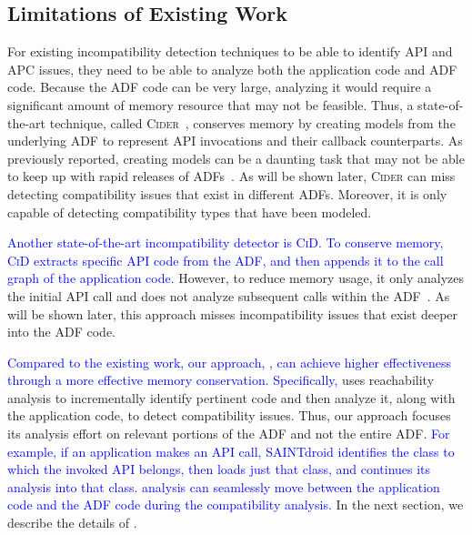 \subsection{Limitations of Existing Work}


For existing incompatibility detection techniques to be able
to identify API and APC issues, they need to be able to
analyze both the application code and ADF code. Because the
ADF code can be very large, analyzing it would require a
significant amount of memory resource that may not be
feasible. Thus, a state-of-the-art technique, called
\textsc{Cider}~\cite{huang2018understanding}, conserves memory by creating models from the underlying ADF to represent API invocations and their
callback counterparts.  
As previously reported, creating models can be a daunting task
that may not be able to keep up with rapid releases of
ADFs~\cite{vanderMerwe2012}.  As will be shown later,
\textsc{Cider} can miss detecting compatibility issues that
exist in different ADFs.  Moreover, it is only capable of
detecting compatibility types that have been modeled.

\textcolor{blue}{
Another state-of-the-art  incompatibility detector is \textsc{CiD}\cite{lili2018cid}. To  conserve memory, \textsc{CiD} extracts
specific API code from the ADF, and then appends it to the
call graph of the application code. } However, to reduce
memory usage, it only analyzes the initial API call and does
not analyze subsequent calls within the
ADF~\cite{lili2018cid}. 
As will be
shown later, this approach misses incompatibility issues
that exist deeper into the ADF code.  

\textcolor{blue}{
Compared to the existing work, 
our approach, \@approach,  can achieve higher
effectiveness through a more effective memory conservation.
Specifically,
}
\@approach uses reachability analysis to
incrementally identify pertinent code and then analyze it,
along with the application code, to detect compatibility
issues. Thus, our approach focuses its analysis effort on
relevant portions of the ADF and not the entire ADF.  
\textcolor{blue}{For example, if an application makes an API call, SAINTdroid identifies the class to which the invoked API belongs, 
then loads just that class, and continues its analysis into that class. 
\@approach analysis can seamlessly move between the application code and the ADF code 
during the compatibility analysis. }
In the next section, we describe the details of
\@approach.


